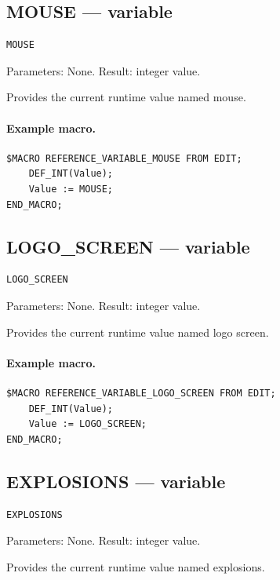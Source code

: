 \documentclass[a4paper,10pt,twoside,openany]{book}
\begin{document}
\label{prim:variable-mouse}
\subsection*{MOUSE --- variable}
\begin{verbatim}
MOUSE
\end{verbatim}
Parameters: None. Result: integer value.

Provides the current runtime value named mouse.

\paragraph{Example macro.}
\begin{verbatim}
$MACRO REFERENCE_VARIABLE_MOUSE FROM EDIT;
    DEF_INT(Value);
    Value := MOUSE;
END_MACRO;
\end{verbatim}

\label{prim:variable-logo-screen}
\subsection*{LOGO\_SCREEN --- variable}
\begin{verbatim}
LOGO_SCREEN
\end{verbatim}
Parameters: None. Result: integer value.

Provides the current runtime value named logo screen.

\paragraph{Example macro.}
\begin{verbatim}
$MACRO REFERENCE_VARIABLE_LOGO_SCREEN FROM EDIT;
    DEF_INT(Value);
    Value := LOGO_SCREEN;
END_MACRO;
\end{verbatim}

\label{prim:variable-explosions}
\subsection*{EXPLOSIONS --- variable}
\begin{verbatim}
EXPLOSIONS
\end{verbatim}
Parameters: None. Result: integer value.

Provides the current runtime value named explosions.
\end{document}
